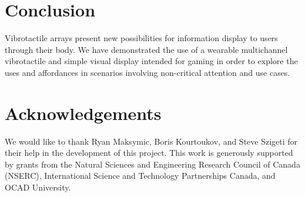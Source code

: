 \documentclass{chi-ext}
\begin{document}
\section{Conclusion}
Vibrotactile arrays present new possibilities for information display to users through their body. We have demonstrated the use of a wearable multichannel vibrotactile and simple visual display intended for gaming in order to explore the uses and affordances in scenarios involving non-critical attention and use cases. 

\section{Acknowledgements}

We would like to thank Ryan Maksymic, Boris Kourtoukov, and Steve Szigeti for their help in the development of this project. This work is generously supported by grants from the Natural Sciences and Engineering Research Council of Canada (NSERC), International Science and Technology Partnerships Canada, and OCAD University.

\balance


\end{document}
